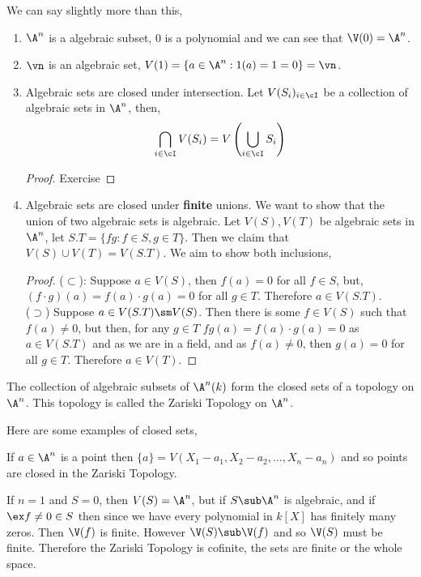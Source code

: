 We can say slightly more than this,
\begin{remark}
 \begin{enumerate}
   \item $\A^n$ is a algebraic subset, $0$ is a polynomial and we can see that $\V(0) = \A^n$.
   \item $\vn$ is an algebraic set, $V(1) = \{a \in \A^n : 1(a) = 1 = 0\} = \vn$.
   \item Algebraic sets are closed under intersection. Let $V(S_i)_{i \in \cI}$ be a collection of algebraic sets in $\A^n$, then,
   $$ \bigcap_{i \in \cI} V(S_i) = V\left(\bigcup_{i \in \cI} S_i \right) $$
   \begin{proof}Exercise
   \end{proof}
   \item Algebraic sets are closed under \textbf{finite} unions. We want to show that the union of two algebraic sets is algebraic. Let $V(S), V(T)$ be algebraic sets in $\A^n$, let $S.T = \{fg : f \in S, g \in T\}$. Then we claim that $V(S) \cup V(T) = V(S.T)$. We aim to show both inclusions,\\
   \begin{proof}
     ($\subset$): Suppose $a \in V(S)$, then $f(a) = 0$ for all $f \in S$, but, $(f \cdot g) (a) = f(a) \cdot g(a) = 0$ for all $g \in T$. Therefore $a \in V(S.T)$.\\
     ($\supset$) Suppose $a \in V(S.T) \sm V(S)$. Then there is some $f \in V(S)$ such that $f(a)\ne 0$, but then, for any $g \in T$ $fg(a) = f(a) \cdot g(a) = 0$ as $a \in V(S.T)$ and as we are in a field, and as $f(a) \ne 0$, then $g(a) = 0$ for all $g \in T$. Therefore $a \in V(T)$.
   \end{proof}
 \end{enumerate}
\end{remark}

\begin{nprop}
    The collection of algebraic subsets of $\A^n(k)$ form the closed sets of a topology on $\A^n$. This topology is called the Zariski Topology on $\A^n$.
\end{nprop}

Here are some examples of closed sets,
\begin{eg}
  If $a \in \A^n$ is a point then $\{a\} = V(X_1 - a_1, X_2 - a_2, \dots, X_n - a_n)$ and so points are closed in the Zariski Topology.
\end{eg}

\begin{eg}
  If $n = 1$ and $S = 0$, then $V(S) = \A^n$, but if $S \sub \A^n$ is algebraic, and if $\ex f \ne 0 \in S$ then since we have every polynomial in $k[X]$ has finitely many zeros. Then $\V(f)$ is finite. However $\V(S) \sub \V(f)$ and so $\V(S)$ must be finite. Therefore the Zariski Topology is cofinite, the sets are finite or the whole space.
\end{eg}

